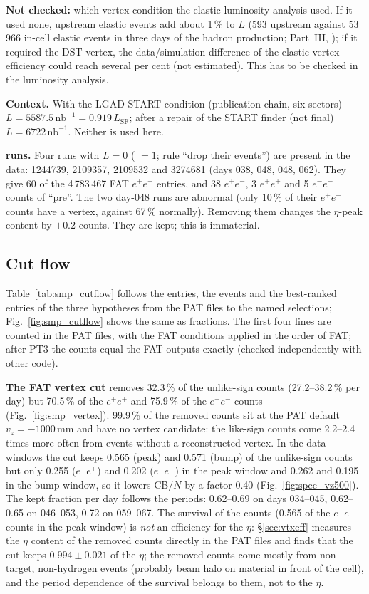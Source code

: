 \documentclass[11pt,a4paper]{article}
\newcommand{\ee}{\ensuremath{e^{+}e^{-}}\xspace}
\newcommand{\nbinv}{\ensuremath{\mathrm{nb}^{-1}}\xspace}
\newcommand{\code}[1]{\texttt{\detokenize{#1}}}
\newcommand{\Lsf}{\ensuremath{L_{\mathrm{SF}}}\xspace}
\newcommand{\vz}{\ensuremath{v_z}\xspace}
\begin{document}
\textbf{Not checked:} which vertex condition the elastic luminosity analysis used. If it used none, upstream elastic
events add about 1\,\% to $L$ (593 upstream against 53\,966 in-cell elastic events in three days of the hadron production;
Part~III, \code{ve_sim_cause_note.md}); if it required the DST vertex,
the data/simulation difference of the elastic vertex efficiency could reach several per cent (not estimated). This has to be
checked in the luminosity analysis.

\textbf{Context.} With the LGAD START condition (publication chain, six sectors) $L=5587.5\,\nbinv=0.919\,\Lsf$;
after a repair of the START finder (not final) $L=6722\,\nbinv$. Neither is used here.

\textbf{\code{no_hf} runs.} Four runs with $L=0$ (\code{no_hf} $=1$; rule ``drop their events'') are
present in the data: 1244739, 2109357, 2109532 and 3274681 (days 038, 048, 048, 062). They give 60 of the
4\,783\,467 FAT \ee entries, and 38 \ee, 3 $e^+e^+$ and 5 $e^-e^-$ counts of ``pre''. The two day-048 runs are
abnormal (only 10\,\% of their \ee counts have a vertex, against 67\,\% normally). Removing them changes the
$\eta$-peak content by $+0.2$ counts. They are kept; this is immaterial.



\subsection{Cut flow}
\label{sec:cutflow}
Table~\ref{tab:smp_cutflow} follows the entries, the events and the best-ranked entries of the three hypotheses from
the PAT files to the named selections; Fig.~\ref{fig:smp_cutflow} shows the same as fractions. The first
four lines are counted in the PAT files, with the FAT conditions applied in the order of FAT; after PT3
the counts equal the FAT outputs exactly (checked independently with other code).

\textbf{The FAT vertex cut} removes 32.3\,\% of the unlike-sign counts (27.2--38.2\,\% per day) but 70.5\,\%
of the $e^+e^+$ and 75.9\,\% of the $e^-e^-$ counts (Fig.~\ref{fig:smp_vertex}). 99.9\,\% of the removed counts
sit at the PAT default $\vz=-1000$\,mm and have no vertex candidate: the like-sign counts come 2.2--2.4 times
more often from events without a reconstructed vertex. In the data windows the cut keeps 0.565 (peak) and
0.571 (bump) of the unlike-sign counts but only 0.255 ($e^+e^+$) and 0.202 ($e^-e^-$) in the peak window and
0.262 and 0.195 in the bump window, so it lowers CB$/N$ by a factor 0.40 (Fig.~\ref{fig:spec_vz500}). The kept
fraction per day follows the periods: 0.62--0.69 on days 034--045, 0.62--0.65 on 046--053, 0.72 on 059--067.
The survival of the counts (0.565 of the \ee counts in the peak window) is \emph{not} an efficiency for the $\eta$: \S\ref{sec:vtxeff}
measures the $\eta$ content of the removed counts directly in the PAT files and finds that the cut keeps $0.994\pm0.021$ of the $\eta$; the
removed counts come mostly from non-target, non-hydrogen events (probably beam halo on material in front of the cell), and the period dependence of the
survival belongs to them, not to the $\eta$.
\end{document}
